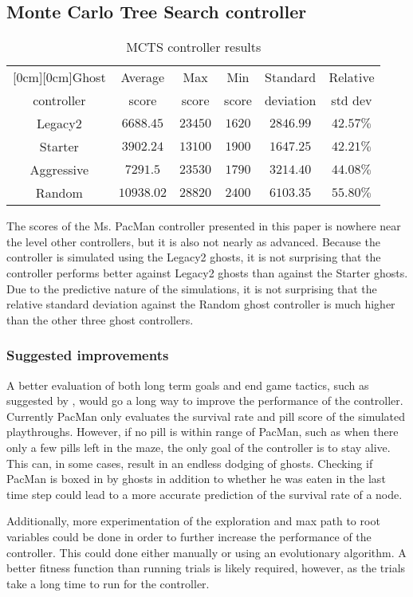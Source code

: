 \subsection{Monte Carlo Tree Search controller}
\begin{table}[h]
\caption{MCTS controller results}
\begin{center}
\begin{tabular}{|c|c|c|c|c|c|}
\hline
\multicolumn{1}{|c|}{\raisebox{-0.50ex}[0cm][0cm]{\!Ghost\!}}
& \multicolumn{1}{|c|}{Average}
& \multicolumn{1}{|c|}{Max}
& \multicolumn{1}{|c|}{Min} 
& \multicolumn{1}{|c|}{Standard}
& \multicolumn{1}{|c|}{Relative}\\
controller & score & score & score & deviation & std dev \\ \hline
Legacy2 &  $6688.45$  &  $23450$  &  $1620$ & $2846.99$ & $42.57\%$\\ \hline
Starter &  $3902.24$  &  $13100$  &  $1900$ & $1647.25$ & $42.21\%$\\ \hline
Aggressive &  $7291.5$  &  $23530$  &  $1790$ & $3214.40$ & $44.08\%$\\ \hline
Random &  $10938.02$  &  $28820$  &  $2400$ & $6103.35$ & $55.80\%$\\ \hline
\end{tabular}
\label{table-mctsResults}
\end{center}
\end{table}

The scores of the Ms. PacMan controller presented in this paper is nowhere near the level other controllers\cite{pepels2012enhancements}, but it is also not nearly as advanced. Because the controller is simulated using the Legacy2 ghosts, it is not surprising that the controller performs better against Legacy2 ghosts than against the Starter ghosts. Due to the predictive nature of the simulations, it is not surprising that the relative standard deviation against the Random ghost controller is much higher than the other three ghost controllers.

\subsubsection{Suggested improvements}
A better evaluation of both long term goals and end game tactics, such as suggested by \citet{pepels2012enhancements}, would go a long way to improve the performance of the controller. Currently PacMan only evaluates the survival rate and pill score of the simulated playthroughs. However, if no pill is within range of PacMan, such as when there only a few pills left in the maze, the only goal of the controller is to stay alive. This can, in some cases, result in an endless dodging of ghosts. Checking if PacMan is boxed in by ghosts in addition to whether he was eaten in the last time step could lead to a more accurate prediction of the survival rate of a node.

Additionally, more experimentation of the exploration and max path to root variables could be done in order to further increase the performance of the controller. This could done either manually or using an evolutionary algorithm. A better fitness function than running trials is likely required, however, as the trials take a long time to run for the controller.